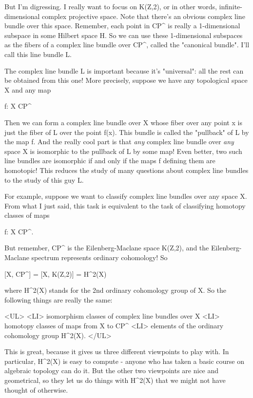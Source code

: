 But I'm digressing.  I really want to focus on K(Z,2), or in other
words, infinite-dimensional complex projective space.  Note that there's
an obvious complex line bundle over this space.  Remember, each point in
CP^{\infty } is 
really a 1-dimensional subspace in some Hilbert space H. 
So we can use these 1-dimensional subspaces as the fibers of a complex
line bundle over CP^{\infty }, 
called the "canonical bundle".  I'll
call this line bundle L.

The complex line bundle L is important because it's "universal": all 
the rest can be obtained from this one!  More precisely, suppose we
have any topological space X and any map 

f: X \to  CP^{\infty }  

Then we can form a complex line bundle over X whose fiber over any point
x is just the fiber of L over the point f(x).  This bundle is called the
"pullback" of L by the map f.   And the really cool part 
is that \emph{any} 
complex line bundle over \emph{any} space X is isomorphic to the pullback of 
L by some map!  Even better, two such line bundles are isomorphic if and 
only if the maps f defining them are homotopic!  This reduces the study 
of many questions about complex line bundles to the study of this guy L.

For example, suppose we want to classify complex line bundles over any 
space X.  From what I just said, this task is equivalent to the task of
classifying homotopy classes of maps 

f: X \to  CP^{\infty }.

But remember, CP^{\infty } is the Eilenberg-Maclane space K(Z,2), and
the Eilenberg-Maclane spectrum represents ordinary cohomology!  So

[X, CP^{\infty }] = [X, K(Z,2)] = H^{2}(X)

where H^{2}(X) 
stands for the 2nd ordinary cohomology group of X.   So 
the following things are really the same:

<UL>
<LI> isomorphism classes of complex line bundles over X
<LI> homotopy classes of maps from X to CP^{\infty }
<LI> elements of the ordinary cohomology group H^{2}(X).
</UL>

This is great, because it gives us three different viewpoints to play
with.  In particular, H^{2}(X) 
is easy to compute - anyone who has taken 
a basic course on algebraic topology can do it.  But the other two
viewpoints are nice and geometrical, so they let us do things with H^{2}(X)
that we might not have thought of otherwise.

